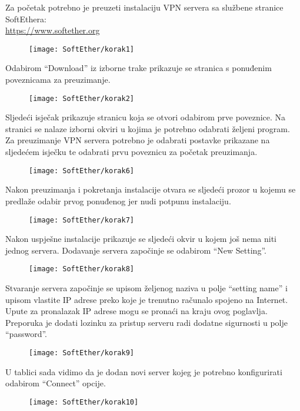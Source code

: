 \hfill \smallbreak
Za početak potrebno je preuzeti instalaciju VPN servera sa službene stranice SoftEthera:\\ \url{https://www.softether.org}
\begin{figure}[h!]
	\centering
     \texttt{[image: SoftEther/korak1]}
\end{figure}
\FloatBarrier
Odabirom ``Download'' iz izborne trake prikazuje se stranica s ponuđenim poveznicama za preuzimanje.
\begin{figure}[h!]
     \centering
     \texttt{[image: SoftEther/korak2]}
\end{figure}
\FloatBarrier
Sljedeći isječak prikazuje stranicu koja se otvori odabirom prve poveznice. Na stranici se nalaze izborni okviri u kojima je potrebno odabrati željeni program. Za preuzimanje VPN servera potrebno je odabrati postavke prikazane na sljedećem isječku te odabrati prvu poveznicu za početak preuzimanja.
\begin{figure}[h!]
     \centering
     \texttt{[image: SoftEther/korak6]}
\end{figure}
\FloatBarrier
Nakon preuzimanja i pokretanja instalacije otvara se sljedeći prozor u kojemu se predlaže odabir prvog ponuđenog jer nudi potpunu instalaciju.
\begin{figure}[h!]
     \centering
     \texttt{[image: SoftEther/korak7]}
\end{figure}
\FloatBarrier
Nakon uspješne instalacije prikazuje se sljedeći okvir u kojem još nema niti jednog servera. Dodavanje servera započinje se odabirom ``New Setting''.
\begin{figure}[h!]
     \centering
     \texttt{[image: SoftEther/korak8]}
\end{figure}
\FloatBarrier
Stvaranje servera započinje se upisom željenog naziva u polje ``setting name'' i upisom vlastite IP adrese preko koje je trenutno računalo spojeno na Internet. Upute za pronalazak IP adrese mogu se pronaći na kraju ovog poglavlja. Preporuka je dodati lozinku za pristup serveru radi dodatne sigurnosti u polje ``password''.
\begin{figure}[h!]
     \centering
     \texttt{[image: SoftEther/korak9]}
\end{figure}
\FloatBarrier
U tablici sada vidimo da je dodan novi server kojeg je potrebno konfigurirati odabirom ``Connect'' opcije.
\begin{figure}[h!]
     \centering
     \texttt{[image: SoftEther/korak10]}
\end{figure}
